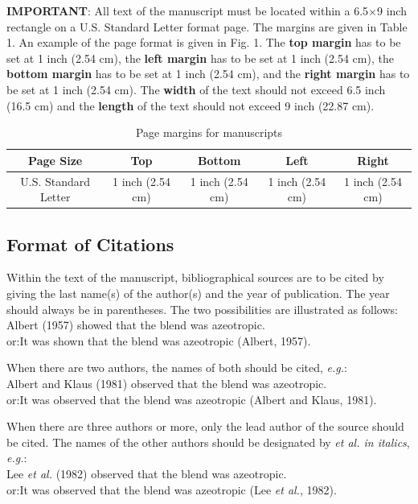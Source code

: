 \documentclass[10pt]{extarticle}
\begin{document}
\textbf{IMPORTANT}: All text of the manuscript must be located within a 6.5$\times$9 inch rectangle on a U.S. Standard Letter format page.  The margins are given in Table 1.  An example of the page format is given in Fig. 1.  The \textbf{top margin} has to be set at 1 inch (2.54 cm), the \textbf{left margin} has to be set at 1 inch (2.54 cm), the \textbf{bottom margin} has to be set at 1 inch (2.54 cm), and the \textbf{right margin} has to be set at 1 inch (2.54 cm).  The \textbf{width} of the text should not exceed 6.5 inch (16.5 cm) and the \textbf{length} of the text should not exceed 9 inch (22.87 cm). 

\begin{table}[b]
\centering
\caption{Page margins for manuscripts}
\begin{tabular}{ccccc}
\toprule
\textbf{Page Size} & \textbf{Top} & \textbf{Bottom} & \textbf{Left} & \textbf{Right} \\ 
\midrule 
U.S. Standard Letter & 1 inch (2.54 cm) & 1 inch (2.54 cm) & 1 inch (2.54 cm) & 1 inch (2.54 cm) \\ 
\bottomrule 
\end{tabular}
\end{table} 

\subsection{Format of Citations}
Within the text of the manuscript, bibliographical sources are to be cited by giving the last name(s) of the author(s) and the year of publication.  The year should always be in parentheses.  The two possibilities are illustrated as follows:\\
\tabto{0.3in}Albert (1957) showed that the blend was azeotropic.\\
or:\tabto{0.3in}It was shown that the blend was azeotropic (Albert, 1957). 

When there are two authors, the names of both should be cited, \textit{e.g.}:\\
\tabto{0.3in}Albert and Klaus (1981) observed that the blend was azeotropic.\\
or:\tabto{0.3in}It was observed that the blend was azeotropic (Albert and Klaus, 1981). 

When there are three authors or more, only the lead author of the source should be cited. The names of the other authors should be designated by \textit{et al. in italics}, \textit{e.g.}:\\
\tabto{0.3in}Lee \textit{et al.} (1982) observed that the blend was azeotropic.\\ 
or:\tabto{0.3in}It was observed that the blend was azeotropic (Lee \textit{et al.}, 1982). 
\end{document}
